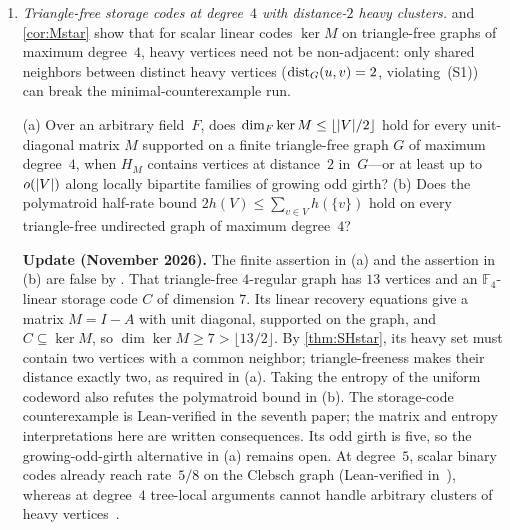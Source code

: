 \begin{enumerate}[label=\arabic*.,leftmargin=2em]
\item \emph{Triangle-free storage codes at degree~$4$ with distance-$2$ heavy clusters.}  and
  \cref{cor:Mstar} show that for scalar linear codes $\ker M$ on triangle-free graphs of maximum degree~$4$, heavy vertices
  need not be non-adjacent: only shared neighbors between distinct heavy vertices ($\operatorname{dist}_G(u, v) = 2$, violating~(S1)) can
  break the minimal-counterexample run.
  \begin{problem}\label{prob:deg4-dist2}
  (a) Over an arbitrary field~$F$, does $\dim_F \ker M \le \lfloor \lvert V \rvert/2 \rfloor$ hold for every unit-diagonal matrix
  $M$ supported on a finite triangle-free graph $G$ of maximum degree~$4$, when $H_M$ contains vertices at distance~$2$
  in~$G$---or at least up to $o(\lvert V \rvert)$ along locally bipartite families of growing odd girth?
  (b) Does the polymatroid half-rate bound $2 h(V) \le \sum_{v \in V} h(\{v\})$ hold on every triangle-free undirected graph
  of maximum degree~$4$?
  \end{problem}
  \textbf{Update (November 2026).} The finite assertion in (a) and the assertion in (b) are false by
  \cite[Example~7.8]{SeventhPaper2026}. That triangle-free $4$-regular graph has $13$ vertices and an
  $\mathbb F_4$-linear storage code $C$ of dimension $7$. Its linear recovery equations give a matrix $M=I-A$
  with unit diagonal, supported on the graph, and $C\subseteq\ker M$, so $\dim\ker M\ge7>\lfloor13/2\rfloor$.
  By \cref{thm:SHstar}, its heavy set must contain two vertices with a common neighbor; triangle-freeness makes
  their distance exactly two, as required in (a).
  Taking the entropy of the uniform codeword also refutes the polymatroid bound in (b). The storage-code
  counterexample is Lean-verified in the seventh paper; the matrix and entropy interpretations here are written
  consequences. Its odd girth is five, so the growing-odd-girth alternative in (a) remains open.
  At degree~$5$, scalar binary codes already reach rate~$5/8$ on the Clebsch graph
  (Lean-verified in~\cite[Corollary~6.11]{FourthPaper2026}), whereas at degree~$4$ tree-local arguments cannot handle
  arbitrary clusters of heavy vertices~\cite[Proposition~6.28]{FourthPaper2026}.


\end{enumerate}
